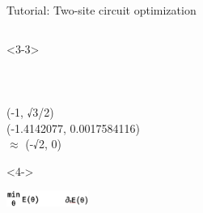 \begin{frame}[fragile]{Tutorial: Two-site circuit optimization}
\begin{columns}
\begin{column}{5cm}
\begin{onlyenv}<3-3>
~\\
~\\
~\\
~\\
(-1, √3/2) \\
(-1.4142077, 0.0017584116) \\
       $\approx$ (-√2, 0) \\
\end{onlyenv}

\begin{onlyenv}<4->
\vspace*{0.0cm}
\begin{center}
\includegraphics[width=0.2\textwidth]{
  slides/assets/min_grad_E_theta.png
}
\end{center}
\vspace*{0.0cm}
\end{onlyenv}
\end{column}

\end{columns}

\end{frame}
